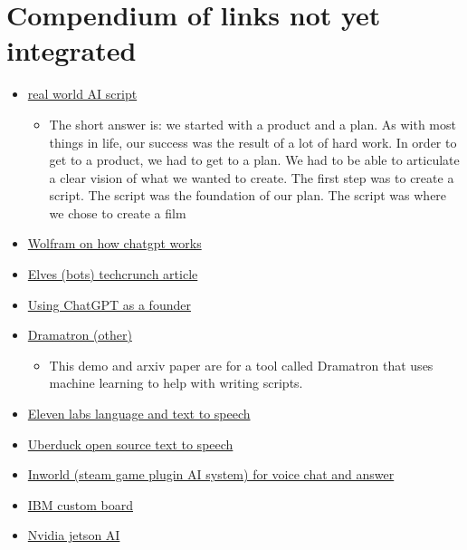 \section{Compendium of links not yet integrated}
\begin{itemize}
\item
  \href{https://stephenfollows.com/how-we-got-hired-to-create-an-ai-generated-feature-film-screenplay/}{real
  world AI script}

  \begin{itemize}
  \tightlist
  \item
    The short answer is: we started with a product and a plan. As with
    most things in life, our success was the result of a lot of hard
    work. In order to get to a product, we had to get to a plan. We had
    to be able to articulate a clear vision of what we wanted to create.
    The first step was to create a script. The script was the foundation
    of our plan. The script was where we chose to create a film
  \end{itemize}
\item
  \href{https://writings.stephenwolfram.com/2023/02/what-is-chatgpt-doing-and-why-does-it-work/}{Wolfram
  on how chatgpt works}

\item
  \href{https://techcrunch.com/2022/01/12/the-metaverse-will-be-filled-with-elves/}{Elves
  (bots) techcrunch article}
\item
  \href{https://www.atomic14.com/2022/12/05/using-chatgpt-as-a-co-founder.html}{Using
  ChatGPT as a founder}
\item
  \href{https://deepmind.github.io/dramatron/}{Dramatron (other)}

  \begin{itemize}
  \tightlist
  \item
    This demo and arxiv paper are for a tool called Dramatron that uses
    machine learning to help with writing scripts.
  \end{itemize}
\item
  \href{https://beta.elevenlabs.io/}{Eleven labs language and text to
  speech}
\item
  \href{https://uberduck.ai/}{Uberduck open source text to speech}
\item
  \href{https://www.youtube.com/watch?v=DnF4WzM5LPU}{Inworld (steam game
  plugin AI system) for voice chat and answer}
\item
  \href{https://www.marktechpost.com/2022/10/27/ibm-research-introduces-artificial-intelligence-unit-aiu-its-first-complete-system-on-chip-designed-to-run-and-train-deep-learning-models-faster-and-more-efficiently-than-a-general-purpose-cpu/}{IBM
  custom board}
\item
  \href{https://www.okdo.com/p/nvidia-jetson-agx-orin-64gb-developer-kit/}{Nvidia
  jetson AI}


\end{itemize}
